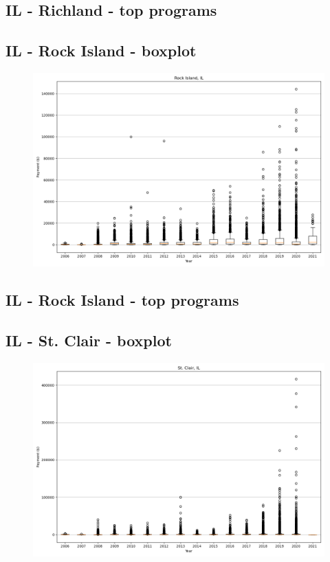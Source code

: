 \subsection*{IL - Richland - top programs}

\newpage
\subsection*{IL - Rock Island - boxplot}
\begin{figure}[h]
\centering
\includegraphics[width=7in]{../output/boxplots/counties/Rock Island-IL_boxplot.png}
\end{figure}


\subsection*{IL - Rock Island - top programs}

\newpage
\subsection*{IL - St. Clair - boxplot}
\begin{figure}[h]
\centering
\includegraphics[width=7in]{../output/boxplots/counties/St. Clair-IL_boxplot.png}
\end{figure}


